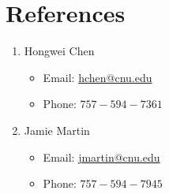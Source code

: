 \documentclass{hw}
\begin{document}
\section*{References}

\begin{enumerate}
\item Hongwei Chen
\begin{itemize}
\item Email: \url{hchen@cnu.edu}
\item Phone: $757-594-7361$
\end{itemize}

\item Jamie Martin
\begin{itemize}
\item Email: \url{jmartin@cnu.edu}
\item Phone: $757-594-7945$
\end{itemize}
\end{enumerate}
\end{document}
